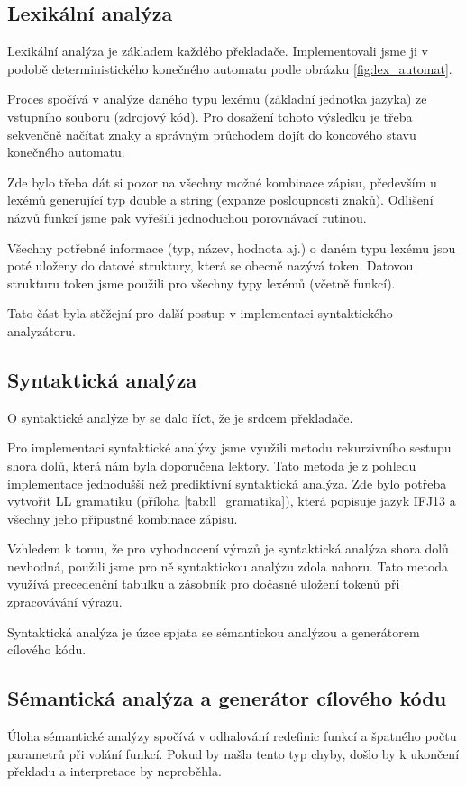\documentclass[12pt,a4paper]{article}
\begin{document}
\subsection{Lexikální analýza}
Lexikální analýza je základem každého překladače. 
Implementovali jsme ji v podobě deterministického konečného automatu podle obrázku \ref{fig:lex_automat}.
 
Proces spočívá v analýze daného typu lexému (základní jednotka jazyka) ze vstupního souboru (zdrojový kód). Pro dosažení tohoto výsledku je třeba sekvenčně načítat znaky a správným průchodem dojít do koncového stavu konečného automatu.
 
Zde bylo třeba dát si pozor na všechny možné kombinace zápisu, především u lexémů generující typ double a string (expanze posloupnosti znaků). Odlišení názvů funkcí jsme pak vyřešili jednoduchou porovnávací rutinou.

Všechny potřebné informace (typ, název, hodnota aj.) o daném typu lexému jsou poté uloženy do datové struktury, která se obecně nazývá token. Datovou strukturu token jsme použili pro všechny typy lexémů (včetně funkcí). 

Tato část byla stěžejní pro další postup v implementaci syntaktického analyzátoru.

\subsection{Syntaktická analýza}
O syntaktické analýze by se dalo říct, že je srdcem překladače.

Pro implementaci syntaktické analýzy jsme využili metodu rekurzivního sestupu shora dolů, která nám byla doporučena lektory. 
Tato metoda je z pohledu implementace jednodušší než prediktivní syntaktická analýza. 
Zde bylo potřeba vytvořit LL gramatiku (příloha \ref{tab:ll_gramatika}), která popisuje jazyk IFJ13 a 
všechny jeho přípustné kombinace zápisu. 

Vzhledem k tomu, že pro vyhodnocení výrazů je syntaktická analýza shora dolů nevhodná, 
použili jsme pro ně syntaktickou analýzu zdola nahoru. 
Tato metoda využívá precedenční tabulku a zásobník pro dočasné uložení tokenů při zpracovávání výrazu.

Syntaktická analýza je úzce spjata se sémantickou analýzou a generátorem cílového kódu.

\subsection{Sémantická analýza a generátor cílového kódu}
Úloha sémantické analýzy spočívá v odhalování redefinic funkcí a špatného počtu parametrů při volání funkcí. Pokud by našla tento typ chyby, došlo by k ukončení překladu a interpretace by neproběhla. 
 
\end{document}
